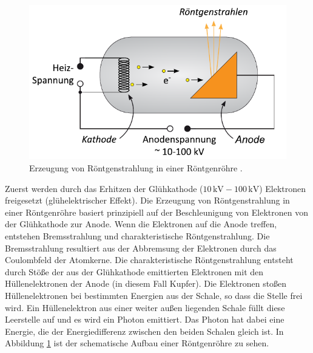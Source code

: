 \begin{figure}[H]
  \centering
  \includegraphics[scale=0.75]{röntgenröhre.pdf}
  \caption{Erzeugung von Röntgenstrahlung in einer Röntgenröhre \cite{uni_goettingen}.}
  \label{fig:roentgenroehre}
\end{figure}
\noindent
Zuerst werden durch das Erhitzen der Glühkathode ($10\,\unit{\kilo\volt}-100\,\unit{\kilo\volt}$) Elektronen freigesetzt (glühelektrischer Effekt).
Die Erzeugung von Röntgenstrahlung in einer Röntgenröhre basiert prinzipiell auf der Beschleunigung von Elektronen 
von der Glühkathode zur Anode. Wenn die Elektronen auf die Anode treffen, entstehen Bremsstrahlung 
und charakteristische Röntgenstrahlung. Die Bremsstrahlung resultiert aus der Abbremsung der Elektronen 
durch das Coulombfeld der Atomkerne. 
Die charakteristische Röntgenstrahlung entsteht durch Stöße der aus der Glühkathode emittierten Elektronen 
mit den Hüllenelektronen der Anode (in diesem Fall Kupfer). Die Elektronen stoßen Hüllenelektronen bei bestimmten
Energien aus der Schale, so dass die Stelle frei wird. Ein Hüllenelektron aus einer weiter außen liegenden Schale füllt diese Leerstelle auf
und es wird ein Photon emittiert. Das Photon hat dabei eine Energie, die der Energiedifferenz zwischen den beiden Schalen gleich ist.
In Abbildung \ref{fig:roentgenroehre} ist der schematische Aufbau einer 
Röntgenröhre zu sehen.




